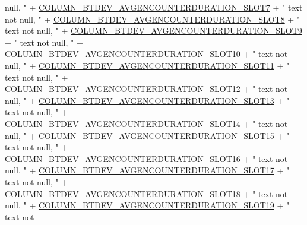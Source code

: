 \begin{DoxyCode}
{       null, "}
            + \hyperlink{classcs_1_1usense_1_1db_1_1_usense_s_q_lite_helper_aea9d176131b332672a82e58411670c9a}{COLUMN\_BTDEV\_AVGENCOUNTERDURATION\_SLOT7} + \textcolor{stringliteral}{" text not
       null, "}
            + \hyperlink{classcs_1_1usense_1_1db_1_1_usense_s_q_lite_helper_ae6d896f593ebdce22d22ace021dc3a05}{COLUMN\_BTDEV\_AVGENCOUNTERDURATION\_SLOT8} + \textcolor{stringliteral}{" text not
       null, "}
            + \hyperlink{classcs_1_1usense_1_1db_1_1_usense_s_q_lite_helper_aba3e1c471fa73dda5a9ff1dbb2a989db}{COLUMN\_BTDEV\_AVGENCOUNTERDURATION\_SLOT9} + \textcolor{stringliteral}{" text not
       null, "}
            + \hyperlink{classcs_1_1usense_1_1db_1_1_usense_s_q_lite_helper_a61d8bcbbafbf9b14a772fb3633d07964}{COLUMN\_BTDEV\_AVGENCOUNTERDURATION\_SLOT10} + \textcolor{stringliteral}{" text not
       null, "}
            + \hyperlink{classcs_1_1usense_1_1db_1_1_usense_s_q_lite_helper_afcbdd9c400be39e5180590d7c56f0faa}{COLUMN\_BTDEV\_AVGENCOUNTERDURATION\_SLOT11} + \textcolor{stringliteral}{" text not
       null, "}
            + \hyperlink{classcs_1_1usense_1_1db_1_1_usense_s_q_lite_helper_a45933d8508439467866ba2077b3aa866}{COLUMN\_BTDEV\_AVGENCOUNTERDURATION\_SLOT12} + \textcolor{stringliteral}{" text not
       null, "}
            + \hyperlink{classcs_1_1usense_1_1db_1_1_usense_s_q_lite_helper_ac1a690ff33aa0c71b1725faf15f21eba}{COLUMN\_BTDEV\_AVGENCOUNTERDURATION\_SLOT13} + \textcolor{stringliteral}{" text not
       null, "}
            + \hyperlink{classcs_1_1usense_1_1db_1_1_usense_s_q_lite_helper_ad826a396fad72798fd4d0f817f9442d4}{COLUMN\_BTDEV\_AVGENCOUNTERDURATION\_SLOT14} + \textcolor{stringliteral}{" text not
       null, "}
            + \hyperlink{classcs_1_1usense_1_1db_1_1_usense_s_q_lite_helper_ab91edc3b68ef1317845043e3f2f1fb63}{COLUMN\_BTDEV\_AVGENCOUNTERDURATION\_SLOT15} + \textcolor{stringliteral}{" text not
       null, "}
            + \hyperlink{classcs_1_1usense_1_1db_1_1_usense_s_q_lite_helper_a9ca23e6d30282621a29e70ecddeaeb2c}{COLUMN\_BTDEV\_AVGENCOUNTERDURATION\_SLOT16} + \textcolor{stringliteral}{" text not
       null, "}
            + \hyperlink{classcs_1_1usense_1_1db_1_1_usense_s_q_lite_helper_a017ea19c1e1ea505a615a5f7d8626db8}{COLUMN\_BTDEV\_AVGENCOUNTERDURATION\_SLOT17} + \textcolor{stringliteral}{" text not
       null, "}
            + \hyperlink{classcs_1_1usense_1_1db_1_1_usense_s_q_lite_helper_a75cbdef7e3541ed44bbde609c34d0737}{COLUMN\_BTDEV\_AVGENCOUNTERDURATION\_SLOT18} + \textcolor{stringliteral}{" text not
       null, "}
            + \hyperlink{classcs_1_1usense_1_1db_1_1_usense_s_q_lite_helper_ac4b28c428834acacd25150b92dbc7de8}{COLUMN\_BTDEV\_AVGENCOUNTERDURATION\_SLOT19} + \textcolor{stringliteral}{" text not
}
\end{DoxyCode}

